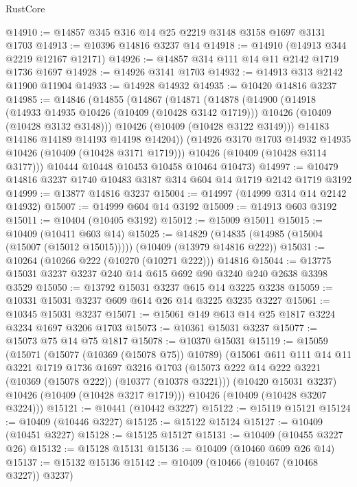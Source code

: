 \begin{lexlean}{RustCore}
\begin{coremodule}
@14910 := @14857 @345 @316 @14 @25 @2219 @3148 @3158 @1697 @3131 @1703
@14913 := @10396 @14816 @3237 @14
@14918 := @14910 (@14913 @344 @2219 @12167 @12171)
@14926 := @14857 @314 @111 @14 @11 @2142 @1719 @1736 @1697
@14928 := @14926 @3141 @1703
@14932 := @14913 @313 @2142 @11900 @11904
@14933 := @14928 @14932
@14935 := @10420 @14816 @3237
@14985 := @14846
    (@14855
      (@14867
        (@14871
          (@14878
            (@14900
              (@14918
                (@14933 @14935 @10426 (@10409 (@10428 @3142 @1719)))
                @10426
                (@10409 (@10428 @3132 @3148)))
              @10426
              (@10409 (@10428 @3122 @3149)))
            @14183
            @14186
            @14189
            @14193
            @14198
            @14204))
        (@14926 @3170 @1703 @14932 @14935 @10426 (@10409 (@10428 @3171 @1719)))
        @10426
        (@10409 (@10428 @3114 @3177)))
      @10444
      @10448
      @10453
      @10458
      @10464
      @10473)
@14997 := @10479 @14816 @3237 @1740 @10483 @3187 @314 @604 @14 @1719 @2142 @1719 @3192
@14999 := @13877 @14816 @3237
@15004 := @14997 (@14999 @314 @14 @2142 @14932)
@15007 := @14999 @604 @14 @3192
@15009 := @14913 @603 @3192
@15011 := @10404 (@10405 @3192)
@15012 := @15009 @15011
@15015 := @10409 (@10411 @603 @14)
@15025 := @14829 (@14835 (@14985 (@15004 (@15007 (@15012 @15015))))) (@10409 (@13979 @14816 @222))
@15031 := @10264 (@10266 @222 (@10270 (@10271 @222))) @14816
@15044 := @13775 @15031 @3237 @3237 @240 @14 @615 @692 @90 @3240 @240 @2638 @3398 @3529
@15050 := @13792 @15031 @3237 @615 @14 @3225 @3238
@15059 := @10331 @15031 @3237 @609 @614 @26 @14 @3225 @3235 @3227
@15061 := @10345 @15031 @3237
@15071 := @15061 @149 @613 @14 @25 @1817 @3224 @3234 @1697 @3206 @1703
@15073 := @10361 @15031 @3237
@15077 := @15073 @75 @14 @75 @1817
@15078 := @10370 @15031
@15119 := @15059
    (@15071
      (@15077 (@10369 (@15078 @75)) @10789)
      (@15061
        @611
        @111
        @14
        @11
        @3221
        @1719
        @1736
        @1697
        @3216
        @1703
        (@15073 @222 @14 @222 @3221 (@10369 (@15078 @222)) (@10377 (@10378 @3221)))
        (@10420 @15031 @3237)
        @10426
        (@10409 (@10428 @3217 @1719)))
      @10426
      (@10409 (@10428 @3207 @3224)))
@15121 := @10441 (@10442 @3227)
@15122 := @15119 @15121
@15124 := @10409 (@10446 @3227)
@15125 := @15122 @15124
@15127 := @10409 (@10451 @3227)
@15128 := @15125 @15127
@15131 := @10409 (@10455 @3227 @26)
@15132 := @15128 @15131
@15136 := @10409 (@10460 @609 @26 @14)
@15137 := @15132 @15136
@15142 := @10409 (@10466 (@10467 (@10468 @3227)) @3237)

\end{coremodule}
\end{lexlean}
